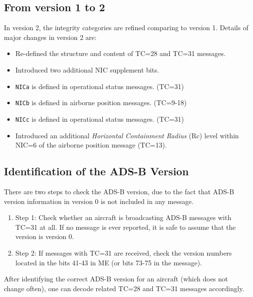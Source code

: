 \subsection{From version 1 to 2}

In version 2, the integrity categories are refined comparing to version 1. Details of major changes in version 2 are:

\begin{itemize}
\item
  Re-defined the structure and content of TC=28 and TC=31 messages.
\item
  Introduced two additional NIC supplement bits.
\item
  \texttt{NICa} is defined in operational status messages.
  (TC=31)
\item
  \texttt{NICb} is defined in airborne position messages.
  (TC=9-18)
\item
  \texttt{NICc} is defined in operational status messages.
  (TC=31)
\item
  Introduced an additional \emph{Horizontal Containment Radius} (Rc) level within NIC=6 of the airborne position message (TC=13).
\end{itemize}

\subsection{Identification of the ADS-B Version}

There are two steps to check the ADS-B version, due to the fact that ADS-B version information in version 0 is not included in any message.

\begin{enumerate}
\def\labelenumi{\arabic{enumi}.}
\item
  Step 1: Check whether an aircraft is broadcasting ADS-B messages with   TC=31 at all. If no message is ever reported, it is safe to assume that the version is version 0.
\item
  Step 2: If messages with TC=31 are received, check the version numbers located in the bits 41-43 in ME (or bits 73-75 in the message).
\end{enumerate}

After identifying the correct ADS-B version for an aircraft (which does not change often), one can decode related TC=28 and TC=31 messages accordingly.


